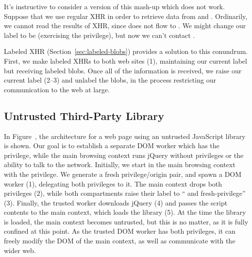 It's instructive to consider a version of this mash-up which does not
work.  Suppose that we use regular XHR in order to retrieve data from
 and .  Ordinarily, we cannot read
the results of XHR, since  does not flow to .
We might change our label to be  (exercising the 
privilege), but now we can't contact .

Labeled XHR (Section~\ref{sec:labeled-blobs}) provides a solution to
this conundrum.  First, we make labeled XHRs to both web sites (1),
maintaining our current label but receiving labeled blobs.  Once all of
the information is received, we raise our current label (2--3) and
unlabel the blobs, in the process restricting our communication to the
web at large.

\subsection{Untrusted Third-Party Library}


In Figure~, the architecture for a web page using an
untrusted JavaScript library is shown.  Our goal is to establish a
separate DOM worker which has the  privilege, while the
main browsing context runs jQuery without privileges or the ability to
talk to the network.  Initially, we start in the main browsing context
with the  privilege.  We generate a fresh privilege/origin
pair, and spawn a DOM worker (1), delegating both privileges to it.  The
main context drops both privileges (2), while both compartments raise
their label to `` and fresh-privilege'' (3).  Finally, the
trusted worker downloads jQuery (4) and passes the script contents to
the main context, which loads the library (5).  At the time the library
is loaded, the main context becomes untrusted, but this is no matter, as
it is fully confined at this point.  As the trusted DOM worker has both
privileges, it can freely modify the DOM of the main context, as well as
communicate with the wider web.
